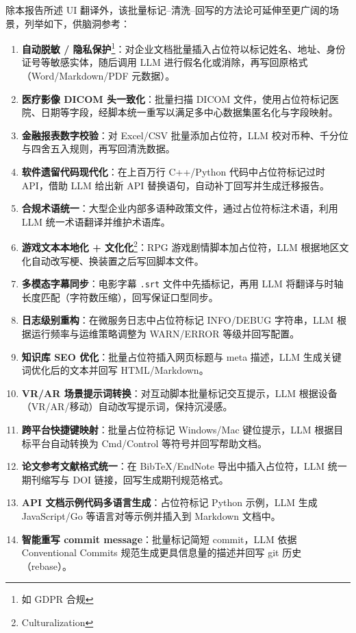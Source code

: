 \documentclass[12pt]{article}
\begin{document}
除本报告所述 UI 翻译外，该批量标记–清洗–回写的方法论可延伸至更广阔的场景，列举如下，供脑洞参考：
\begin{enumerate}
  \item \textbf{自动脱敏 / 隐私保护}\footnote{如 GDPR 合规}：对企业文档批量插入占位符以标记姓名、地址、身份证号等敏感实体，随后调用 LLM 进行假名化或消除，再写回原格式（Word/Markdown/PDF 元数据）。
  \item \textbf{医疗影像 DICOM 头一致化}：批量扫描 DICOM 文件，使用占位符标记医院、日期等字段，经脚本统一重写以满足多中心数据集匿名化与字段映射。
  \item \textbf{金融报表数字校验}：对 Excel/CSV 批量添加占位符，LLM 校对币种、千分位与四舍五入规则，再写回清洗数据。
  \item \textbf{软件遗留代码现代化}：在上百万行 C++/Python 代码中占位符标记过时 API，借助 LLM 给出新 API 替换语句，自动补丁回写并生成迁移报告。
  \item \textbf{合规术语统一}：大型企业内部多语种政策文件，通过占位符标注术语，利用 LLM 统一术语翻译并维护术语库。
  \item \textbf{游戏文本本地化 + 文化化}\footnote{Culturalization}：RPG 游戏剧情脚本加占位符，LLM 根据地区文化自动改写梗、换装置之后写回脚本文件。
  \item \textbf{多模态字幕同步}：电影字幕 \texttt{.srt} 文件中先插标记，再用 LLM 将翻译与时轴长度匹配（字符数压缩），回写保证口型同步。
  \item \textbf{日志级别重构}：在微服务日志中占位符标记 INFO/DEBUG 字符串，LLM 根据运行频率与运维策略调整为 WARN/ERROR 等级并回写配置。
  \item \textbf{知识库 SEO 优化}：批量占位符插入网页标题与 meta 描述，LLM 生成关键词优化后的文本并回写 HTML/Markdown。
  \item \textbf{VR/AR 场景提示词转换}：对互动脚本批量标记交互提示，LLM 根据设备（VR/AR/移动）自动改写提示词，保持沉浸感。
  \item \textbf{跨平台快捷键映射}：批量占位符标记 Windows/Mac 键位提示，LLM 根据目标平台自动转换为 Cmd/Control 等符号并回写帮助文档。
  \item \textbf{论文参考文献格式统一}：在 BibTeX/EndNote 导出中插入占位符，LLM 统一期刊缩写与 DOI 链接，回写生成期刊规范格式。
  \item \textbf{API 文档示例代码多语言生成}：占位符标记 Python 示例，LLM 生成 JavaScript/Go 等语言对等示例并插入到 Markdown 文档中。
  \item \textbf{智能重写 commit message}：批量标记简短 commit，LLM 依据 Conventional Commits 规范生成更具信息量的描述并回写 git 历史（rebase）。

\end{enumerate}
\end{document}
